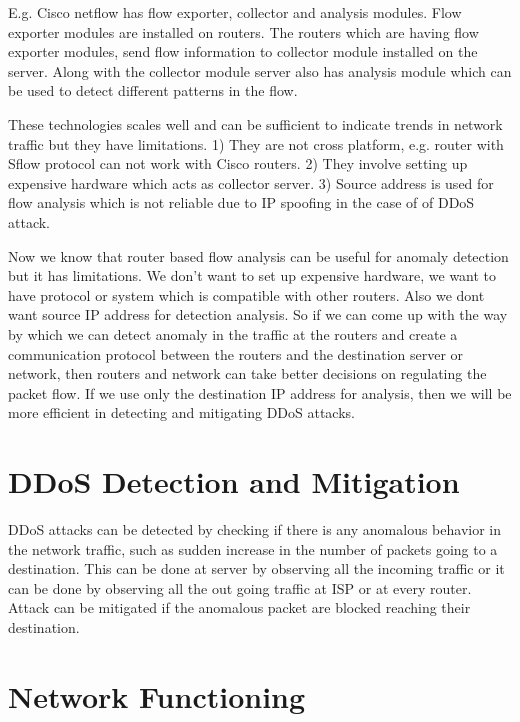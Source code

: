 \documentclass[12pt,oneside,a4paper]{article}
\begin{document}
E.g. Cisco netflow has flow exporter, collector and analysis modules. Flow exporter modules are installed on routers. The routers which are having flow exporter modules, send flow information to collector module installed on the server. Along with the collector module server also has analysis module which can be used to detect different patterns in the flow.\par

These technologies scales well and can be sufficient to indicate trends in network traffic but they have limitations. 1) They are not cross platform, e.g. router with Sflow protocol can not work with Cisco routers. 2) They involve setting up expensive hardware which acts as collector server. 3) Source address is used for flow analysis which is not reliable due to IP spoofing in the case of of DDoS attack.\par

Now we know that router based flow analysis can be useful for anomaly detection but it has limitations. We don't want to set up expensive hardware, we want to have protocol or system which is compatible with other routers. Also we dont want source IP address for detection analysis. So if we can come up with the way by which we can detect anomaly in the traffic at the routers and create a communication protocol between the routers and the destination server or network, then routers and network can take better decisions on regulating the packet flow. If we use only the destination IP address for analysis, then we will be more efficient in detecting and mitigating DDoS attacks.

\section{DDoS Detection and Mitigation}

DDoS attacks can be detected by checking if there is any anomalous behavior in the network traffic, such as sudden increase in the number of packets going to a destination. This can be done at server by observing all the incoming traffic or it can be done by observing all the out going traffic at ISP or at every router. Attack can be mitigated if the anomalous packet are blocked reaching their destination.

\section{Network Functioning}
\end{document}
